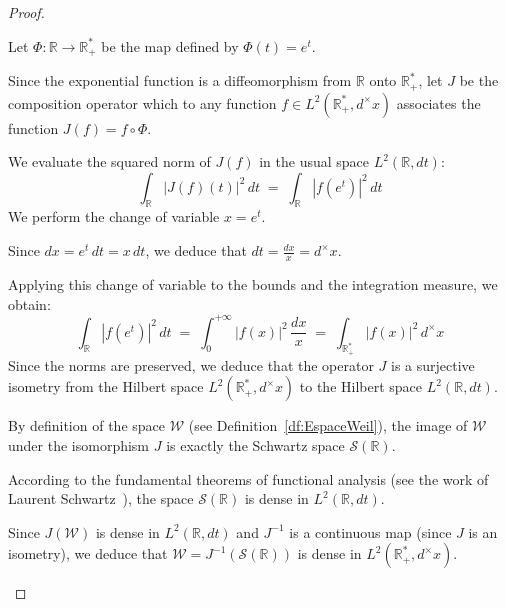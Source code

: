 \documentclass[Riemann_Hypothesis.tex]{subfiles}
\begin{document}
\begin{proof}
    \begin{part_proof}
        Let $\Phi : \mathbb{R} \to \mathbb{R}_+^*$ be the map defined by $\Phi(t) = e^t$. \par
        Since the exponential function is a diffeomorphism from $\mathbb{R}$ onto $\mathbb{R}_+^*$, let $J$ be the composition operator which to any function $f \in L^2(\mathbb{R}_+^*, d^\times x)$ associates the function $J(f) = f \circ \Phi$. \par
        We evaluate the squared norm of $J(f)$ in the usual space $L^2(\mathbb{R}, dt)$:
        \begin{equation*}
            \int_{\mathbb{R}} \left| J(f)(t) \right|^2 \, dt \;=\; \int_{\mathbb{R}} \left| f(e^t) \right|^2 \, dt
        \end{equation*}
        We perform the change of variable $x = e^t$. \par
        Since $dx = e^t \, dt = x \, dt$, we deduce that $dt = \frac{dx}{x} = d^\times x$. \par
        Applying this change of variable to the bounds and the integration measure, we obtain:
        \begin{equation*}
            \int_{\mathbb{R}} \left| f(e^t) \right|^2 \, dt \;=\; \int_{0}^{+\infty} \left| f(x) \right|^2 \, \frac{dx}{x} \;=\; \int_{\mathbb{R}_+^*} \left| f(x) \right|^2 \, d^\times x
        \end{equation*}
        Since the norms are preserved, we deduce that the operator $J$ is a surjective isometry from the Hilbert space $L^2(\mathbb{R}_+^*, d^\times x)$ to the Hilbert space $L^2(\mathbb{R}, dt)$. \medskip\par
        By definition of the space $\mathcal{W}$ (see {Definition}~\ref{df:EspaceWeil}), the image of $\mathcal{W}$ under the isomorphism $J$ is exactly the Schwartz space $\mathcal{S}(\mathbb{R})$. \par
        According to the fundamental theorems of functional analysis 
        (see the work of Laurent Schwartz~\cite{schwartz1966_distributions_en}), the space $\mathcal{S}(\mathbb{R})$ is dense in $L^2(\mathbb{R}, dt)$. \par
        Since $J(\mathcal{W})$ is dense in $L^2(\mathbb{R}, dt)$ and $J^{-1}$ is a continuous map (since $J$ is an isometry), we deduce that $\mathcal{W} = J^{-1}(\mathcal{S}(\mathbb{R}))$ is dense in $L^2(\mathbb{R}_+^*, d^\times x)$.
    \end{part_proof}
\end{proof}
\end{document}
